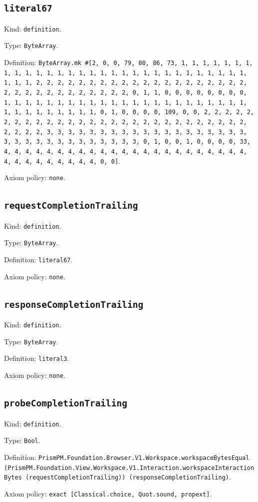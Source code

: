 \documentclass[11pt]{article}
\begin{document}
\subsection*{\texttt{literal67}}
\noindent Kind: \texttt{definition}.\par
\noindent Type: \texttt{ByteArray}.\par
\noindent Definition: \texttt{ByteArray.mk \#[2, 0, 0, 79, 80, 86, 73, 1, 1, 1, 1, 1, 1, 1, 1, 1, 1, 1, 1, 1, 1, 1, 1, 1, 1, 1, 1, 1, 1, 1, 1, 1, 1, 1, 1, 1, 1, 1, 1, 1, 2, 2, 2, 2, 2, 2, 2, 2, 2, 2, 2, 2, 2, 2, 2, 2, 2, 2, 2, 2, 2, 2, 2, 2, 2, 2, 2, 2, 2, 2, 2, 2, 0, 1, 1, 0, 0, 0, 0, 0, 0, 0, 0, 1, 1, 1, 1, 1, 1, 1, 1, 1, 1, 1, 1, 1, 1, 1, 1, 1, 1, 1, 1, 1, 1, 1, 1, 1, 1, 1, 1, 1, 1, 1, 1, 0, 1, 0, 0, 0, 0, 109, 0, 0, 2, 2, 2, 2, 2, 2, 2, 2, 2, 2, 2, 2, 2, 2, 2, 2, 2, 2, 2, 2, 2, 2, 2, 2, 2, 2, 2, 2, 2, 2, 2, 2, 3, 3, 3, 3, 3, 3, 3, 3, 3, 3, 3, 3, 3, 3, 3, 3, 3, 3, 3, 3, 3, 3, 3, 3, 3, 3, 3, 3, 3, 3, 3, 3, 0, 1, 0, 0, 1, 0, 0, 0, 0, 33, 4, 4, 4, 4, 4, 4, 4, 4, 4, 4, 4, 4, 4, 4, 4, 4, 4, 4, 4, 4, 4, 4, 4, 4, 4, 4, 4, 4, 4, 4, 4, 4, 0, 0]}.\par
\noindent Axiom policy: \texttt{none}.\par
\subsection*{\texttt{requestCompletionTrailing}}
\noindent Kind: \texttt{definition}.\par
\noindent Type: \texttt{ByteArray}.\par
\noindent Definition: \texttt{literal67}.\par
\noindent Axiom policy: \texttt{none}.\par
\subsection*{\texttt{responseCompletionTrailing}}
\noindent Kind: \texttt{definition}.\par
\noindent Type: \texttt{ByteArray}.\par
\noindent Definition: \texttt{literal3}.\par
\noindent Axiom policy: \texttt{none}.\par
\subsection*{\texttt{probeCompletionTrailing}}
\noindent Kind: \texttt{definition}.\par
\noindent Type: \texttt{Bool}.\par
\noindent Definition: \texttt{PrismPM.Foundation.Browser.V1.Workspace.workspaceBytesEqual (PrismPM.Foundation.View.Workspace.V1.Interaction.workspaceInteractionBytes (requestCompletionTrailing)) (responseCompletionTrailing)}.\par
\noindent Axiom policy: \texttt{exact [Classical.choice, Quot.sound, propext]}.\par
\end{document}
